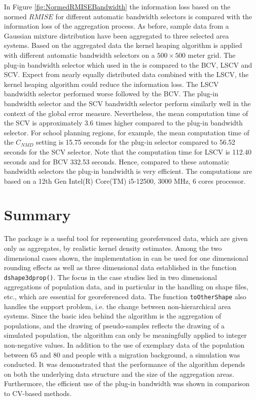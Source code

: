 In Figure \ref{fig:NormedRMISEBandwidth} the information loss based on the normed $RMISE$ for different automatic bandwidth selectors is compared with the information loss of the aggregation process. 
As before, sample data from a Gaussian mixture distribution have been aggregated to three selected area systems. Based on the aggregated data the kernel heaping algorithm is applied with different automatic bandwidth selectors on a $500 \times 500$ meter grid. The plug-in bandwidth selector which used in the \hyperlink{https://cran.r-project.org/web/packages/Kernelheaping/index.html}{} is compared to the BCV, LSCV and SCV. 
Expect from nearly equally distributed data combined with the LSCV, the kernel heaping algorithm could reduce the information loss. The LSCV bandwidth selector performed worse followed by the BCV. The plug-in bandwidth selector and the SCV bandwidth selector perform similarly well in the context of the global error measure. Nevertheless, the mean computation time of the SCV is approximately 3.6 times higher compared to the plug-in bandwidth selector. 
For school planning regions, for example, the mean computation time of the $C_{NMD}$ setting is 
15.75 seconds for the plug-in selector compared to 56.52 seconds for the SCV selector. Note that the computation time for LSCV is 112.40 seconds and for BCV 332.53 seconds. 
Hence, compared to these automatic bandwidth selectors the plug-in bandwidth is very efficient. The computations are based on a 12th Gen Intel(R) Core(TM) i5-12500, 3000 MHz, 6 cores processor. 


\hypertarget{Summary}{%
\section{Summary}\label{Summary}}

The \hyperlink{https://cran.r-project.org/web/packages/Kernelheaping/index.html}{} package is a useful tool for representing georeferenced data, which are given only as aggregates, by realistic kernel density estimates. Among the two dimensional cases shown, the implementation in  can be used for one dimensional rounding effects as well as three dimensional data established in the function \texttt{dshape3dprop()}. 
The focus in the case studies lied in two dimensional aggregations of population data, and in particular in the handling on shape files, etc., which are essential for georeferenced data. The function \texttt{toOtherShape} also handles the support problem, i.e. the change between non-hierarchical area systems. Since the basic idea behind the algorithm is the aggregation of populations, and the drawing of pseudo-samples reflects the drawing of a simulated population, the algorithm can only be meaningfully applied to integer non-negative values. 
In addition to the use of exemplary data of the population between 65 and 80 and people with a migration background, a simulation was conducted. It was demonstrated that the performance of the algorithm depends on both the underlying data structure and the size of the aggregation areas. Furthermore, the efficient use of the plug-in bandwidth was shown in comparison to CV-based methods.



